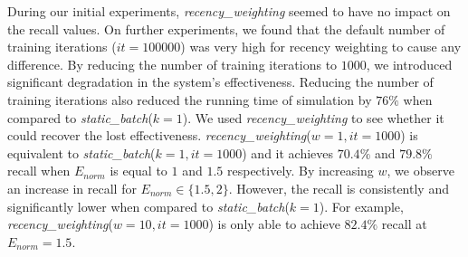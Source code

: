 During our initial experiments, \textit{recency\_weighting} seemed to have no
impact on the recall values. On further experiments, we found that the default
number of training iterations ($it=100000$) was very high for recency
weighting to cause any difference. By reducing the number of training iterations
to $1000$, we introduced significant degradation in the system's effectiveness.
Reducing the number of training iterations also
reduced the running time of simulation by $76\%$ when compared to
\textit{static\_batch}($k = 1$). We used \textit{recency\_weighting} to see
whether it could recover the lost effectiveness.
\textit{recency\_weighting}($w=1,it=1000$) is equivalent to
\textit{static\_batch}($k=1,it=1000$) and it achieves $70.4\%$ and $79.8\%$
recall when $E_{norm}$ is equal to $1$ and $1.5$ respectively. By increasing
$w$, we observe an increase in recall for $E_{norm} \in \{1.5, 2\}$. However,
the recall is consistently and significantly lower when compared to
\textit{static\_batch}($k=1$). For example,
\textit{recency\_weighting}($w=10,it=1000$) is only able to achieve $82.4\%$
recall at $E_{norm}=1.5$.







